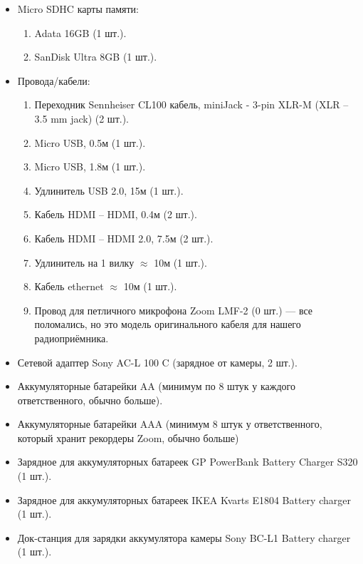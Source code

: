 \begin{itemize}[noitemsep]
  \item \textsf{Micro SDHC} карты памяти:
        \begin{enumerate}
          \item \textsf{Adata 16GB} (1 шт.).
          \item \textsf{SanDisk Ultra 8GB} (1 шт.).
        \end{enumerate}\vspace{0.4\baselineskip}

  \item Провода/кабели:
        \begin{enumerate}
          \item Переходник \textsf{Sennheiser CL100 кабель, miniJack - 3-pin XLR-M} (XLR -- 3.5 mm jack) (2 шт.).
          \item \textsf{Micro USB}, 0.5м (1 шт.).
          \item \textsf{Micro USB}, 1.8м (1 шт.).
          \item Удлинитель \textsf{USB} 2.0, 15м (1 шт.).
          \item Кабель \textsf{HDMI -- HDMI}, 0.4м (2 шт.).
          \item Кабель \textsf{HDMI -- HDMI} 2.0, 7.5м (2 шт.).
          \item Удлинитель на 1 вилку $\approx$ 10м (1 шт.).
          \item Кабель \textsf{ethernet} $\approx$ 10м (1 шт.).
          \item Провод для петличного микрофона \textsf{Zoom LMF-2} (0 шт.) --- все поломались, но это модель оригинального кабеля для нашего радиоприёмника.
        \end{enumerate}\vspace{0.4\baselineskip}

  \item Сетевой адаптер \textsf{Sony AC-L 100 C} (зарядное от камеры, 2 шт.).
  \item Аккумуляторные батарейки \textsf{AA} (минимум по 8 штук у каждого ответственного, обычно больше).
  \item Аккумуляторные батарейки \textsf{AAA} (минимум 8 штук у ответственного, который хранит рекордеры \textsf{Zoom}, обычно больше)
  \item Зарядное для аккумуляторных батареек \textsf{GP PowerBank Battery Charger S320} (1 шт.).
  \item Зарядное для аккумуляторных батареек \textsf{IKEA Kvarts E1804 Battery charger} (1 шт.).
  \item Док-станция для зарядки аккумулятора камеры \textsf{Sony BC-L1 Battery charger} (1 шт.).
\end{itemize}
